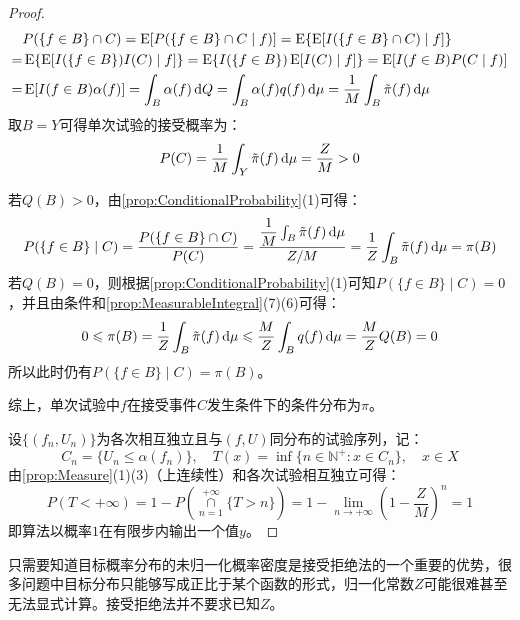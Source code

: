 \begin{proof}
	\begin{align*}
		&P(\{f\in B\}\cap C)=\operatorname{E}[P(\{f\in B\}\cap C\mid f)]=\operatorname{E}\{\operatorname{E}[I(\{f\in B\}\cap C)\mid f]\} \\
		=&\operatorname{E}\{\operatorname{E}[I(\{f\in B\})I(C)\mid f]\}=\operatorname{E}\{I(\{f\in B\})\operatorname{E}[I(C)\mid f]\}=\operatorname{E}[I(f\in B)P(C\mid f)] \\
		=&\operatorname{E}[I(f\in B)\alpha(f)]=\int_{B}\alpha(f)\mathop{}\!\mathrm{d} Q=\int_{B}\alpha(f)q(f)\mathop{}\!\mathrm{d}\mu=\frac{1}{M}\int_{B}\tilde{\pi}(f)\mathop{}\!\mathrm{d}\mu
	\end{align*}
	取$B=Y$可得单次试验的接受概率为：
	\begin{equation*}
		P(C)=\frac{1}{M}\int_{Y}\tilde{\pi}(f)\mathop{}\!\mathrm{d}\mu=\frac{Z}{M}>0
	\end{equation*}\par
	若$Q(B)>0$，由\cref{prop:ConditionalProbability}(1)可得：
	\begin{equation*}
		P(\{f\in B\}\mid C)=\frac{P(\{f\in B\}\cap C)}{P(C)}=\frac{\dfrac{1}{M}\int_{B}\tilde{\pi}(f)\mathop{}\!\mathrm{d}\mu}{Z/M}=\frac{1}{Z}\int_{B}\tilde{\pi}(f)\mathop{}\!\mathrm{d}\mu=\pi(B)
	\end{equation*}
	若$Q(B)=0$，则根据\cref{prop:ConditionalProbability}(1)可知$P(\{f\in B\}\mid C)=0$，并且由条件和\cref{prop:MeasurableIntegral}(7)(6)可得：
	\begin{equation*}
		0\leqslant\pi(B)=\frac{1}{Z}\int_{B}\tilde{\pi}(f)\mathop{}\!\mathrm{d}\mu\leqslant\frac{M}{Z}\int_{B}q(f)\mathop{}\!\mathrm{d}\mu=\frac{M}{Z}Q(B)=0
	\end{equation*}
	所以此时仍有$P(\{f\in B\}\mid C)=\pi(B)$。\par
	综上，单次试验中$f$在接受事件$C$发生条件下的条件分布为$\pi$。\par
	设$\{(f_n,U_n)\}$为各次相互独立且与$(f,U)$同分布的试验序列，记：
	\begin{equation*}
		C_n=\{U_n\leqslant\alpha(f_n)\},\quad T(x)=\inf\{n\in\mathbb{N}^+:x\in C_n\},\quad x\in X
	\end{equation*}
	由\cref{prop:Measure}(1)(3)（上连续性）和各次试验相互独立可得：
	\begin{equation*}
		P(T<+\infty)=1-P\left(\underset{n=1}{\overset{+\infty}{\cap}}\{T>n\}\right)=1-\lim_{n\to+\infty}\left(1-\frac{Z}{M}\right)^n=1
	\end{equation*}
	即算法以概率$1$在有限步内输出一个值$y$。
\end{proof}
\begin{note}
	只需要知道目标概率分布的未归一化概率密度是接受拒绝法的一个重要的优势，很多问题中目标分布只能够写成正比于某个函数的形式，归一化常数$Z$可能很难甚至无法显式计算。接受拒绝法并不要求已知$Z$。
\end{note}

